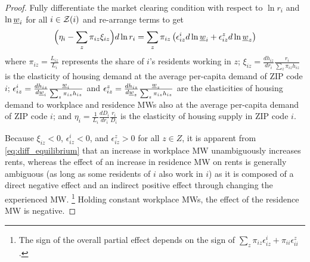 \begin{proof}
    Fully differentiate the market clearing condition with respect to $\ln r_i$ and 
    $\ln \underline{w}_i$ for all $i\in\mathcal{Z}(i)$ and re-arrange terms to get
    \begin{equation}\label{eq:diff_equilibrium}
        \Big(\eta_i - \sum_z \pi_{iz} \xi_{iz} \Big) d \ln r_i
        = 
        \sum_z \pi_{iz} \left(\epsilon_{iz}^i d \ln \underline{w}_i 
                            + \epsilon_{iz}^z d \ln \underline{w}_z \right)
    \end{equation}
    where 
    $\pi_{iz} = \frac{L_{iz}}{L_i}$ represents the share of $i$'s residents working 
    in $z$;
    $\xi_{iz} = \frac{d h_{iz}}{d r_i} \frac{r_i}{\sum_z \pi_{iz} h_{iz}}$ is the 
    elasticity of housing demand at the average per-capita demand of ZIP code $i$;
    $\epsilon_{iz}^i = \frac{d h_{iz}}{d \underline{w}_i} \frac{\underline{w}_i}{\sum_z \pi_{iz} h_{iz}}$ and 
    $\epsilon_{iz}^z = \frac{d h_{iz}}{d \underline{w}_z} \frac{\underline{w}_z}{\sum_z \pi_{iz} h_{iz}}$ 
    are the elasticities of housing demand to workplace and residence MWs also at 
    the average per-capita demand of ZIP code $i$; and
    $\eta_i = \frac{1}{L_i} \frac{d D_i}{d r_i} \frac{r_i}{D_i}$ is the elasticity 
    of housing supply in ZIP code $i$.

    Because $\xi_{iz} < 0$, $\epsilon_{iz}^i < 0$, and $\epsilon_{iz}^z > 0$ for 
    all $z\in Z$, it is apparent from \eqref{eq:diff_equilibrium} that an increase 
    in workplace MW unambiguously increases rents, whereas the effect of an increase
    in residence MW on rents is generally ambiguous (as long as some residents of
    $i$ also work in $i$) as it is composed of a direct negative effect and an 
    indirect positive effect through changing the experienced MW.%
    \footnote{The sign of the overall partial effect depends on the sign of 
    $\sum_z \pi_{iz} \epsilon_{iz}^i + \pi_{ii} \epsilon_{ii}^z$.}
    Holding constant workplace MWs, the effect of the residence MW is negative.
\end{proof}

